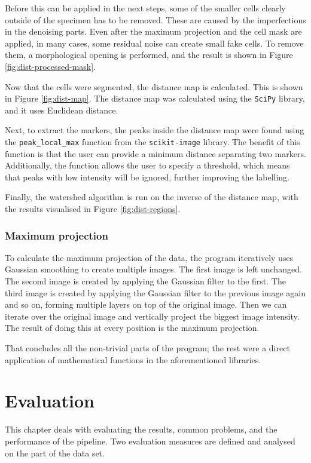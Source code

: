 \documentclass[
  digital,     %
  oneside,     %
  nosansbold,  %
  nocolorbold, %
  lof,         %
  lot,         %
]{fithesis4}
\begin{document}
Before this can be applied in the next steps, some of the smaller cells clearly
outside of the specimen has to be removed. These are caused by the imperfections
in the denoising parts. Even after the maximum projection and the cell mask are
applied, in many cases, some residual noise can create small fake cells. To
remove them, a morphological opening is performed, and the result is shown in
Figure \ref{fig:dist-processed-mask}.

Now that the cells were segmented, the distance map is calculated. This is shown
in Figure \ref{fig:dist-map}. The distance map was
calculated using the \texttt{SciPy} library, and it uses Euclidean distance.

Next, to extract the markers, the peaks inside the distance map were found using
the \texttt{peak\_local\_max} function from the \texttt{scikit-image} library. The benefit of
this function is that the user can provide a minimum distance separating two
markers. Additionally, the function allows the user to specify a threshold, which
means that peaks with low intensity will be ignored, further improving the
labelling.

Finally, the watershed algorithm is run on the inverse of the distance map, with the results
visualised in Figure \ref{fig:dist-regions}.

\subsection{Maximum projection} 
\label{sec:max-proj}
To calculate the maximum projection of the data, the program iteratively uses
Gaussian smoothing to create multiple images. The first image is left unchanged.
The second image is created by applying the Gaussian filter to the first. The
third image is created by applying the Gaussian filter to the previous image
again and so on, forming multiple layers on top of the original image. Then we can
iterate over the original image and vertically project the biggest image intensity.
The result of doing this at every position is the maximum projection.

That concludes all the non-trivial parts of the program; the rest were a direct
application of mathematical functions in the aforementioned libraries.

\clearpage
\chapter{Evaluation}
\label{chp:evaluation}
This chapter deals with evaluating the results, common problems, and the
performance of the pipeline. Two evaluation measures are defined and analysed on the part of
the data set.
\end{document}
